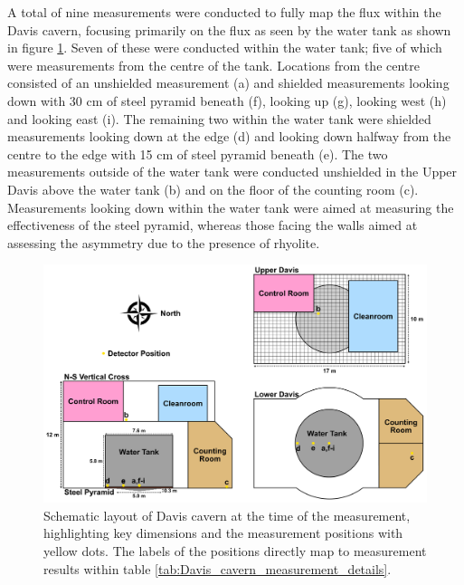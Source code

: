 A total of nine measurements were conducted to fully map the \gray{} flux within the Davis cavern, focusing primarily on the flux as seen by the water tank as shown in figure \ref{fig:davis_cavern_layout}. Seven of these were conducted within the water tank; five of which were measurements from the centre of the tank. Locations from the centre consisted of an unshielded measurement (a) and shielded measurements looking down with 30 cm of steel pyramid beneath (f), looking up (g), looking west (h) and looking east (i). The remaining two within the water tank were shielded measurements looking down at the edge (d) and looking down halfway from the centre to the edge with 15 cm of steel pyramid beneath (e). The two measurements outside of the water tank were conducted unshielded in the Upper Davis above the water tank (b) and on the floor of the counting room (c). Measurements looking down within the water tank were aimed at measuring the effectiveness of the steel pyramid, whereas those facing the walls aimed at assessing the asymmetry due to the presence of rhyolite.
%
\begin{figure}[]
    \centering
    \includegraphics[scale=0.085]{Chapter_3/Figures/Davis_cavern_diagram.jpg}
    \caption[Schematic layout of Davis cavern at the time of the measurement, highlighting key dimensions and the measurement positions with yellow dots.]
    {Schematic layout of Davis cavern at the time of the measurement, highlighting key dimensions and the measurement positions with yellow dots. The labels of the positions directly map to measurement results within table \ref{tab:Davis_cavern_measurement_details}.}
    \label{fig:davis_cavern_layout}
\end{figure}
%
%

